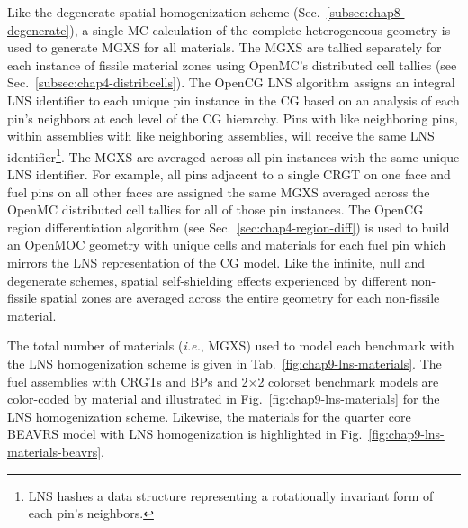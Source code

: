 Like the degenerate spatial homogenization scheme (Sec.~\ref{subsec:chap8-degenerate}), a single \ac{MC} calculation of the complete heterogeneous geometry is used to generate \ac{MGXS} for all materials. The \ac{MGXS} are tallied separately for each instance of fissile material zones using OpenMC's distributed cell tallies (see Sec.~\ref{subsec:chap4-distribcells}). The OpenCG \ac{LNS} algorithm assigns an integral \ac{LNS} identifier to each unique pin instance in the \ac{CG} based on an analysis of each pin's neighbors at each level of the \ac{CG} hierarchy. Pins with like neighboring pins, within assemblies with like neighboring assemblies, will receive the same \ac{LNS} identifier\footnote{\ac{LNS} hashes a data structure representing a rotationally invariant form of each pin's neighbors.}. The \ac{MGXS} are averaged across all pin instances with the same unique \ac{LNS} identifier. For example, all pins adjacent to a single \ac{CRGT} on one face and fuel pins on all other faces are assigned the same \ac{MGXS} averaged across the OpenMC distributed cell tallies for all of those pin instances. The OpenCG region differentiation algorithm (see Sec.~\ref{sec:chap4-region-diff}) is used to build an OpenMOC geometry with unique cells and materials for each fuel pin which mirrors the \ac{LNS} representation of the \ac{CG} model. Like the infinite, null and degenerate schemes, spatial self-shielding effects experienced by different non-fissile spatial zones are averaged across the entire geometry for each non-fissile material.

The total number of materials (\textit{i.e.}, \ac{MGXS}) used to model each benchmark with the \ac{LNS} homogenization scheme is given in Tab.~\ref{fig:chap9-lns-materials}. The fuel assemblies with \acp{CRGT} and \acp{BP} and 2$\times$2 colorset benchmark models are color-coded by material and illustrated in Fig.~\ref{fig:chap9-lns-materials} for the \ac{LNS} homogenization scheme. Likewise, the materials for the quarter core \ac{BEAVRS} model with \ac{LNS} homogenization is highlighted in Fig.~\ref{fig:chap9-lns-materials-beavrs}. 


